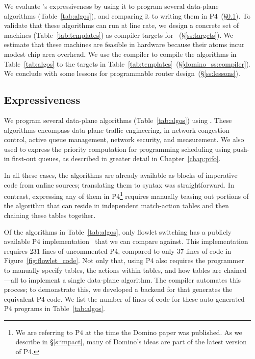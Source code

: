 We evaluate \pktlanguage's expressiveness by using it to program several
data-plane algorithms (Table~\ref{tab:algos}), and comparing it to writing them
in P4~(\S\ref{ss:expressiveness}).  To validate that these algorithms can run
at line rate, we design a concrete set of \absmachine machines
(Table~\ref{tab:templates}) as compiler targets for
\pktlanguage~(\S\ref{ss:targets}).  We estimate that these machines are
feasible in hardware because their atoms incur modest chip area overhead.  We
use the \pktlanguage compiler to compile the algorithms in
Table~\ref{tab:algos} to the targets in
Table~\ref{tab:templates}~(\S\ref{domino_ss:compiler}).  We conclude with some
lessons for programmable router design~(\S\ref{ss:lessons}).

\subsection{Expressiveness}
\label{ss:expressiveness}

We program several data-plane algorithms (Table~\ref{tab:algos}) using
\pktlanguage. These algorithms encompass data-plane traffic engineering,
in-network congestion control, active queue management, network security, and
measurement. We also used \pktlanguage to express the priority computation for
programming scheduling using push-in first-out queues, as described in greater
detail in Chapter~\ref{chap:pifo}.

In all these cases, the algorithms are already available as blocks of
imperative code from online sources; translating them to \pktlanguage syntax
was straightforward. In contrast, expressing any of them in P4\footnote{We are
referring to P4 at the time the Domino paper was published. As we describe in
\S\ref{s:impact}, many of Domino's ideas are part of the latest version of P4.}
requires manually teasing out portions of the algorithm that can reside in
independent match-action tables and then chaining these tables together.

Of the algorithms in Table~\ref{tab:algos}, only flowlet switching has a
publicly available P4 implementation~\cite{p4_flowlet} that we can compare
against. This implementation requires 231 lines of uncommented P4, compared to
only 37 lines of \pktlanguage code in Figure~\ref{fig:flowlet_code}. Not only
that, using P4 also requires the programmer to manually specify tables, the
actions within tables, and how tables are chained---all to implement a single
data-plane algorithm. The \pktlanguage compiler automates this process; to
demonstrate this, we developed a backend for \pktlanguage that generates the
equivalent P4 code. We list the number of lines of code for these
auto-generated P4 programs in Table~\ref{tab:algos}.
